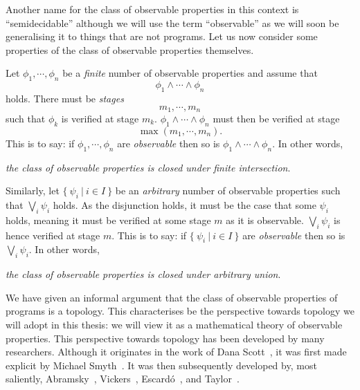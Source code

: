 Another name for the class of observable properties in this context is ``semidecidable''
although we will use the term ``observable'' as we will soon be generalising it to things
that are not programs. Let us now consider some properties of the class of observable
properties themselves.

Let $\phi_1, \cdots ,\phi_n$ be a \emph{finite} number of observable properties and assume that
\begin{equation*}
  \phi_1 \wedge \cdots \wedge \phi_n
\end{equation*}
holds. There must be \emph{stages}
\begin{equation*}
  m_1, \cdots , m_n
\end{equation*}
such that $\phi_k$ is verified at stage $m_k$. $\phi_1 \wedge \cdots \wedge \phi_n$ must then be verified at stage
\begin{equation*}
  \max(m_1, \cdots, m_n).
\end{equation*}
This is to say: if $\phi_1, \cdots, \phi_n$ are \emph{observable} then so is
$\phi_1 \wedge \cdots \wedge \phi_n$. In other words,
\begin{center}
  \emph{the class of observable properties is closed under finite intersection}.
\end{center}

Similarly, let $\{~\psi_i ~|~ i \in I~\}$ be an \emph{arbitrary} number of observable
properties such that $\bigvee_i \psi_i$ holds. As the disjunction holds, it must be the case that
some $\psi_i$ holds, meaning it must be verified at some stage $m$ as it is observable. $\bigvee_i
\psi_i$ is hence verified at stage $m$. This is to say: if $\{~\psi_i ~|~ i \in I~\}$ are
\emph{observable} then so is $\bigvee_i \psi_i$. In other words,
\begin{center}
  \emph{the class of observable properties is closed under arbitrary union}.
\end{center}

We have given an informal argument that the class of observable properties of programs is
a topology. This characterises be the perspective towards topology we will adopt in this
thesis: we will view it as a mathematical theory of observable properties. This
perspective towards topology has been developed by many researchers. Although it
originates in the work of Dana Scott~\cite{scott-original}, it was first made explicit by
Michael Smyth~\cite{smyth-handbook}. It was then subsequently developed by,
most saliently,
  Abramsky~\cite{abramsky-thesis},
  Vickers~\cite{vickers},
  Escardó~\cite{synthetic-topology}, and
  Taylor~\cite{taylor-asd}.

